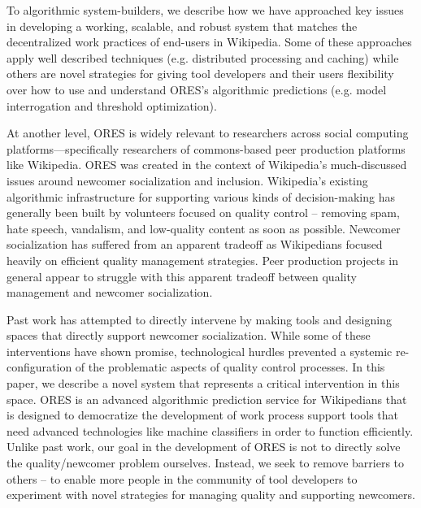 To algorithmic system-builders, we describe how we have approached key issues in developing a working, scalable, and robust system that matches the decentralized work practices of end-users in Wikipedia.  Some of these approaches apply well described techniques (e.g. distributed processing and caching) while others are novel strategies for giving tool developers and their users flexibility over how to use and understand ORES's algorithmic predictions (e.g. model interrogation and threshold optimization).

At another level, ORES is widely relevant to researchers across social computing platforms---specifically researchers of commons-based peer production platforms like Wikipedia. ORES was created in the context of Wikipedia's much-discussed issues around newcomer socialization and inclusion. Wikipedia's existing algorithmic infrastructure for supporting various kinds of decision-making has generally been built by volunteers focused on quality control -- removing spam, hate speech, vandalism, and low-quality content as soon as possible. Newcomer socialization has suffered from an apparent tradeoff as Wikipedians focused heavily on efficient quality management strategies\cite{halfaker2013rise, halfaker2014snuggle}. Peer production projects in general appear to struggle with this apparent tradeoff between quality management and newcomer socialization\cite{teblunthuis2018revisiting}.

Past work has attempted to directly intervene by making tools\cite{halfaker2014snuggle} and designing spaces\cite{morgan2013tea} that directly support newcomer socialization.  While some of these interventions have shown promise\cite{morgan2018evaluating}, technological hurdles prevented a systemic re-configuration of the problematic aspects of quality control processes\cite{halfaker2014snuggle}. In this paper, we describe a novel system that represents a critical intervention in this space.  ORES is an advanced algorithmic prediction service for Wikipedians that is designed to democratize the development of work process support tools that need advanced technologies like machine classifiers in order to function efficiently. Unlike past work, our goal in the development of ORES is not to directly solve the quality/newcomer problem ourselves.  Instead, we seek to remove barriers to others -- to enable more people in the community of tool developers to experiment with novel strategies for managing quality and supporting newcomers.

